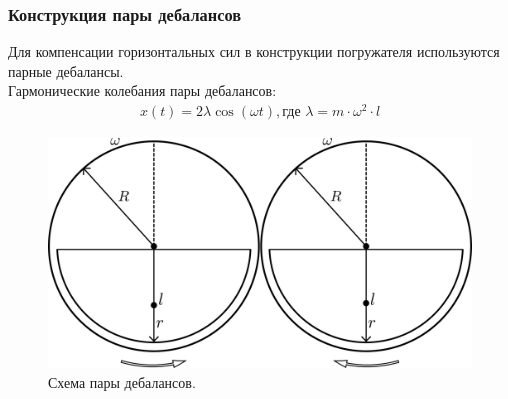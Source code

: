 \documentclass[10pt, pdf, hyperref={unicode}]{beamer}
\begin{document}
    \begin{frame}
        \frametitle{Конструкция пары дебалансов}
        \begin{center}
            \begin{minipage}[h]{0.97\linewidth}
                Для компенсации горизонтальных сил в конструкции погружателя используются парные дебалансы.\\
                Гармонические колебания пары дебалансов:
                \begin{equation}
                    \begin{gathered}
                        x(t) = 2 \lambda \cos (\omega t), \textrm{где } \lambda = m \cdot \omega^2 \cdot l
                    \end{gathered}
                \end{equation}
                \begin{figure}[h]
                    \centering
                    \includegraphics[width=0.52\linewidth]{../img/double_debalance.png}
                    \caption{Схема пары дебалансов.}
                \end{figure}
            \end{minipage}
        \end{center}
    \end{frame}
\end{document}

